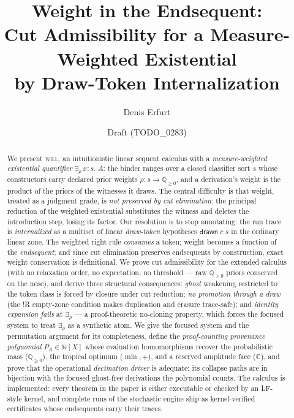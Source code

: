 \documentclass[11pt]{article}
\title{Weight in the Endsequent:\\
  Cut Admissibility for a Measure-Weighted Existential\\
  by Draw-Token Internalization}
\author{Denis Erfurt}
\date{Draft (TODO\_0283)}
\newcommand{\bang}{{!}}                          %
\newcommand{\QQ}{\mathbb{Q}}                     %
\newcommand{\NN}{\mathbb{N}}                     %
\newcommand{\CC}{\mathbb{C}}                     %
\newcommand{\will}{\textsc{will}}                %
\newcommand{\erho}[2]{\exists_{\rho}\, #1{:}#2.\;} %
\newcommand{\dtok}[2]{\mathsf{drawn}\;#1\;#2}      %
\theoremstyle{definition}
\theoremstyle{remark}
\begin{document}
\maketitle

\begin{abstract}
We present \will{}, an intuitionistic linear sequent calculus with a
\emph{measure-weighted existential quantifier} $\erho{x}{s} A$: the
binder ranges over a closed classifier sort $s$ whose constructors carry
declared prior weights $\rho : s \to \QQ_{\geq 0}$, and a derivation's
weight is the product of the priors of the witnesses it draws.  The
central difficulty is that weight, treated as a judgment grade, is
\emph{not preserved by cut elimination}: the principal reduction of the
weighted existential substitutes the witness and deletes the
introduction step, losing its factor.  Our resolution is to stop
annotating: the run trace is \emph{internalized} as a multiset of
linear \emph{draw-token} hypotheses $\dtok{c}{s}$ in the ordinary
linear zone.  The weighted right rule \emph{consumes} a token; weight
becomes a function of the \emph{endsequent}; and since cut elimination
preserves endsequents by construction, exact weight conservation is
definitional.  We prove cut admissibility for the extended calculus
(with no relaxation order, no expectation, no threshold --- raw
$\QQ_{\geq0}$ priors conserved on the nose), and derive three
structural consequences: \emph{ghost} weakening restricted to the token
class is forced by closure under cut reduction; \emph{no promotion
through a draw} (the $\bang$R empty-zone condition makes duplication
and erasure trace-safe); and \emph{identity expansion fails} at
$\exists_\rho$ --- a proof-theoretic no-cloning property, which forces
the focused system to treat $\exists_\rho$ as a synthetic atom.  We
give the focused system and the permutation argument for its
completeness, define the \emph{proof-counting provenance polynomial}
$P_A \in \NN[X]$ whose evaluation homomorphisms recover the
probabilistic mass ($\QQ_{\geq0}$), the tropical optimum
($\min,+$), and a reserved amplitude face ($\CC$), and prove that the
operational \emph{decimation driver} is adequate: its collapse paths
are in bijection with the focused ghost-free derivations the
polynomial counts.  The calculus is implemented: every theorem in the
paper is either executable or checked by an LF-style kernel, and
complete runs of the stochastic engine ship as kernel-verified
certificates whose endsequents carry their traces.
\end{abstract}
\end{document}
